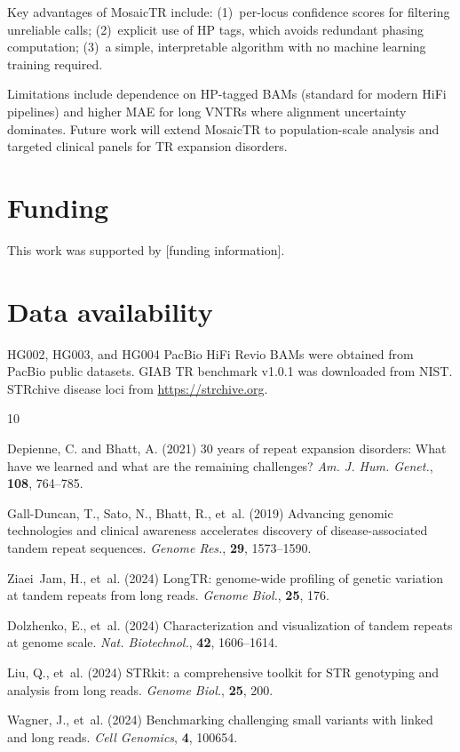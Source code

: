 \documentclass[12pt]{article}
\begin{document}
Key advantages of MosaicTR include:
(1)~per-locus confidence scores for filtering unreliable calls;
(2)~explicit use of HP tags, which avoids redundant phasing computation;
(3)~a simple, interpretable algorithm with no machine learning training required.

Limitations include dependence on HP-tagged BAMs (standard for modern HiFi pipelines) and higher MAE for long VNTRs where alignment uncertainty dominates.
Future work will extend MosaicTR to population-scale analysis and targeted clinical panels for TR expansion disorders.

\section*{Funding}

This work was supported by [funding information].

\section*{Data availability}

HG002, HG003, and HG004 PacBio HiFi Revio BAMs were obtained from PacBio public datasets.
GIAB TR benchmark v1.0.1 was downloaded from NIST.
STRchive disease loci from \url{https://strchive.org}.

\begin{thebibliography}{10}

Depienne, C. and Bhatt, A. (2021)
{30 years of repeat expansion disorders: What have we learned and what are the remaining challenges?}
\textit{Am. J. Hum. Genet.}, \textbf{108}, 764--785.

Gall-Duncan, T., Sato, N., Bhatt, R., et~al. (2019)
{Advancing genomic technologies and clinical awareness accelerates discovery of disease-associated tandem repeat sequences.}
\textit{Genome Res.}, \textbf{29}, 1573--1590.

Ziaei~Jam, H., et~al. (2024)
{LongTR: genome-wide profiling of genetic variation at tandem repeats from long reads.}
\textit{Genome Biol.}, \textbf{25}, 176.

Dolzhenko, E., et~al. (2024)
{Characterization and visualization of tandem repeats at genome scale.}
\textit{Nat. Biotechnol.}, \textbf{42}, 1606--1614.

Liu, Q., et~al. (2024)
{STRkit: a comprehensive toolkit for STR genotyping and analysis from long reads.}
\textit{Genome Biol.}, \textbf{25}, 200.

Wagner, J., et~al. (2024)
{Benchmarking challenging small variants with linked and long reads.}
\textit{Cell Genomics}, \textbf{4}, 100654.

\end{thebibliography}
\end{document}
